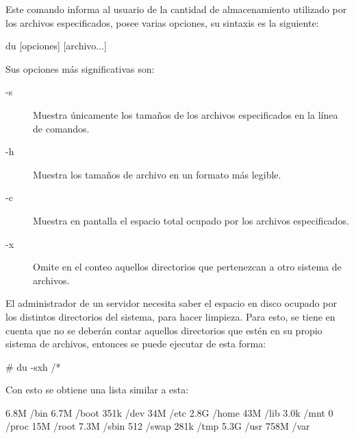 \autor{\LDP}
\colaborador{}
\revisor{\LLC}
\traductor{}

Este comando informa al usuario de la cantidad de almacenamiento
utilizado por los archivos especificados, posee varias opciones, su
sintaxis es la siguiente:

\begin{vscreen}
du [opciones] [archivo...]
\end{vscreen}

Sus opciones m\'as significativas son:

\begin{description}
\item[-s] Muestra \'unicamente los tama\~{n}os de los archivos 
  especificados en la l\'inea de comandos. 
\item[-h] Muestra los tama\~{n}os de archivo en un formato m\'as legible.
\item[-c] Muestra en pantalla el espacio total ocupado por los archivos
  especificados.
\item[-x] Omite en el conteo aquellos directorios que pertenezcan a 
  otro sistema de archivos.
\end{description}

\begin{ejemplo}

El administrador de un servidor necesita saber el espacio en disco
ocupado por los distintos directorios del sistema, para hacer
limpieza. Para esto, se tiene en cuenta que no se deber\'an contar
aquellos directorios que est\'en en su propio sistema de archivos,
entonces se puede ejecutar de esta forma:

\begin{vscreen}
# du -sxh /*
\end{vscreen}

Con esto se obtiene una lista similar a esta:

\begin{vscreen}
6.8M	/bin
6.7M	/boot
351k	/dev
34M	/etc
2.8G	/home
43M	/lib
3.0k	/mnt
0	/proc
15M	/root
7.3M	/sbin
512	/swap
281k	/tmp
5.3G	/usr
758M	/var
\end{vscreen}


\end{ejemplo}
